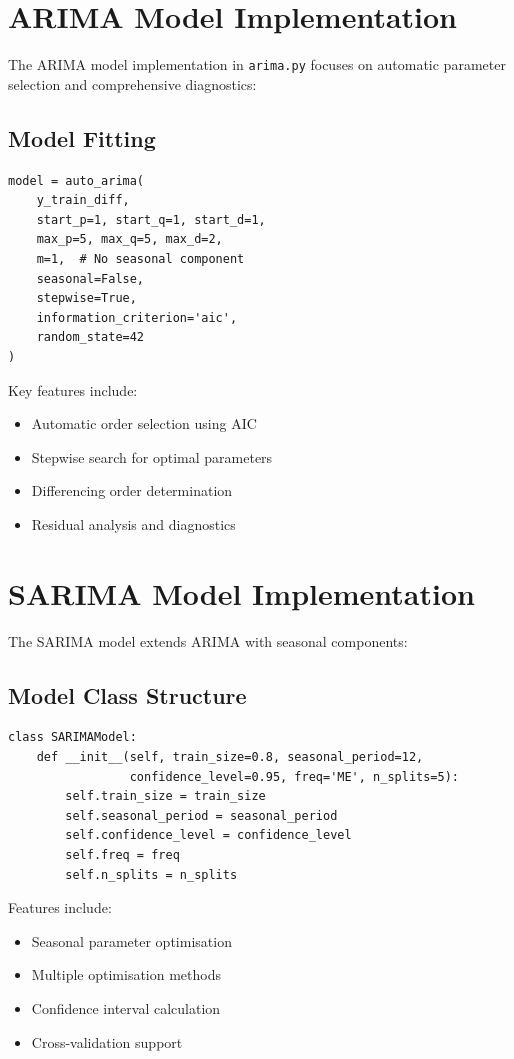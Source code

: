 \documentclass[12pt,a4paper]{report}
\begin{document}
\section{ARIMA Model Implementation}
The ARIMA model implementation in \texttt{arima.py} focuses on automatic parameter selection and comprehensive diagnostics:

\subsection{Model Fitting}
\begin{verbatim}
model = auto_arima(
    y_train_diff,
    start_p=1, start_q=1, start_d=1,
    max_p=5, max_q=5, max_d=2,
    m=1,  # No seasonal component
    seasonal=False,
    stepwise=True,
    information_criterion='aic',
    random_state=42
)
\end{verbatim}

Key features include:
\begin{itemize}
    \item Automatic order selection using AIC
    \item Stepwise search for optimal parameters
    \item Differencing order determination
    \item Residual analysis and diagnostics
\end{itemize}

\section{SARIMA Model Implementation}
The SARIMA model extends ARIMA with seasonal components:

\subsection{Model Class Structure}
\begin{verbatim}
class SARIMAModel:
    def __init__(self, train_size=0.8, seasonal_period=12, 
                 confidence_level=0.95, freq='ME', n_splits=5):
        self.train_size = train_size
        self.seasonal_period = seasonal_period
        self.confidence_level = confidence_level
        self.freq = freq
        self.n_splits = n_splits
\end{verbatim}

Features include:
\begin{itemize}
    \item Seasonal parameter optimisation
    \item Multiple optimisation methods
    \item Confidence interval calculation
    \item Cross-validation support
\end{itemize}
\end{document}
